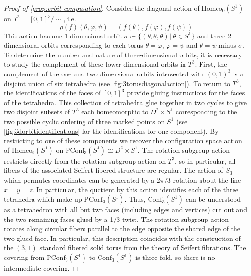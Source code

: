 \documentclass[10pt, oneside]{article}
\newcommand{\homeo}[1][S^1]{\text{Homeo}_0(#1)}
\newcommand{\conf}[2][S^1]{\text{Conf}_{#2}(#1)}
\newcommand{\pconf}[2][S^1]{\text{PConf}_{#2}(#1)}
\theoremstyle{definition}
\theoremstyle{definition}
\begin{document}
\begin{proof}[Proof of \cref{prop:orbit-computation}]
    Consider the diagonal action of $\homeo$ on $T^3=[0,1]^3/\sim$, i.e. $$\rho(f)(\theta, \varphi, \psi) = (f(\theta), f(\varphi), f(\psi))$$ This action has one 1-dimensional orbit $\sigma \coloneqq \{(\theta,\theta,\theta)\,\vert\,\theta\in S^1\}$ and three 2-dimensional orbits corresponding to each torus $\theta=\varphi$, $\varphi=\psi$ and $\theta=\psi$ minus $\sigma$. To determine the number and nature of three-dimensional orbits, it is necessary to study the complement of these lower-dimensional orbits in $T^3$. First, the complement of the one and two dimensional orbits intersected with $(0,1)^3$ is a disjoint union of six tetrahedra (see \cref{fig:3torusdiagonalaction}). To return to $T^3$, the identifications of the faces of $[0,1]^3$ provide gluing instructions for the faces of the tetrahedra. This collection of tetrahedra glue together in two cycles to give two disjoint subsets of $T^3$ each homeomorphic to $D^2 \times S^1$ corresponding to the two possible cyclic ordering of three marked points on $S^1$ (see \cref{fig:3dorbitidentifications} for the identifications for one component). By restricting to one of these components we recover the configuration space action of $\homeo$ on $\pconf[S^1]{3}\cong D^2 \times S^1$. The rotation subgroup action restricts directly from the rotation subgroup action on $T^3$, so in particular, all fibers of the associated Seifert-fibered structure are regular. The action of $S_3$ which permutes coordinates can be generated by a $2\pi/3$ rotation about the line $x=y=z$. In particular, the quotient by this action identifies each of the three tetrahedra which make up $\pconf[S^1]{3}$. Thus, $\conf[S^1]{3}$ can be understood as a tetrahedron with all but two faces (including edges and vertices) cut out and the two remaining faces glued by a 1/3 twist. The rotation subgroup action rotates along circular fibers parallel to the edge opposite the shared edge of the two glued face. In particular, this description coincides with the construction of the $(3, 1)$ standard fibered solid torus from the theory of Seifert fibrations. The covering from $\pconf[S^1]{3}$ to $\conf[S^1]{3}$ is three-fold, so there is no intermediate covering.
\end{proof}
\end{document}
